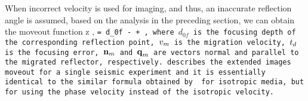 When incorrect velocity is used for imaging, and thus, an inaccurate
reflection angle is assumed, based on the analysis in the preceding
section, we can obtain the moveout function
%
\beq \label{eqn:Ztl_plane_vm}
z \lp \hh, \tt \rp = d_{0f}
-  
+  \;,
\eeq
%
where $d_{0f}$ is the focusing depth of the corresponding reflection
point, $v_{m}$ is the migration velocity, $t_d$ is the focusing error,
${\textbf{n}}_{m}$ and ${\textbf{q}}_m$ are vectors normal and parallel to the migrated
reflector, respectively.  describes the extended
images moveout for a single seismic experiment and it is essentially
identical to the similar formula obtained by
\cite{YangSava.geo.mixlag} for isotropic media, but for using the phase velocity instead of the isotropic velocity.
